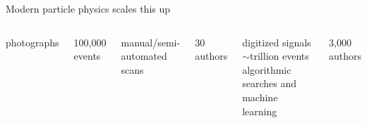\documentclass[aspectratio=169]{beamer}
\begin{document}
\begin{frame}{Modern particle physics scales this up}
\begin{columns}
\begin{center}
\begin{columns}
\centering
\vspace{-1 cm}

photographs

\vspace{\baselineskip}
\vspace{0.5 cm}
100,000 events

\vspace{0.5 cm}
manual/semi-automated scans

\vspace{\baselineskip}
\vspace{0.5 cm}
30 authors

\centering
\vspace{-1 cm}

digitized signals \\

\vspace{0.5 cm}
$\sim$trillion events \\

\vspace{0.5 cm}
algorithmic searches and machine learning

\vspace{0.5 cm}
3,000 authors
\end{columns}
\end{center}


\end{columns}
\end{frame}
\end{document}
